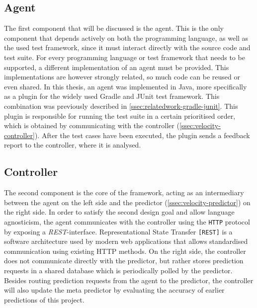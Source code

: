 \subsection{Agent}
\label{ssec:velocity-frontend}
The first component that will be discussed is the agent. This is the only component that depends actively on both the programming language, as well as the used test framework, since it must interact directly with the source code and test suite. For every programming language or test framework that needs to be supported, a different implementation of an agent must be provided. This implementations are however strongly related, so much code can be reused or even shared. In this thesis, an agent was implemented in Java, more specifically as a plugin for the widely used Gradle and JUnit test framework. This combination was previously described in \autoref{ssec:relatedwork-gradle-junit}. This plugin is responsible for running the test suite in a certain prioritised order, which is obtained by communicating with the controller (\autoref{ssec:velocity-controller}). After the test cases have been executed, the plugin sends a feedback report to the controller, where it is analysed.

\subsection{Controller}\label{ssec:velocity-controller}
The second component is the core of the framework, acting as an intermediary between the agent on the left side and the predictor (\autoref{ssec:velocity-predictor}) on the right side. In order to satisfy the second design goal and allow language agnosticism, the agent communicates with the controller using the \texttt{HTTP} protocol by exposing a \emph{REST}-interface. Representational State Transfer \texttt{[REST]} is a software architecture used by modern web applications that allows standardised communication using existing HTTP methods. On the right side, the controller does not communicate directly with the predictor, but rather stores prediction requests in a shared database which is periodically polled by the predictor. Besides routing prediction requests from the agent to the predictor, the controller  will also update the meta predictor by evaluating the accuracy of earlier predictions of this project.

